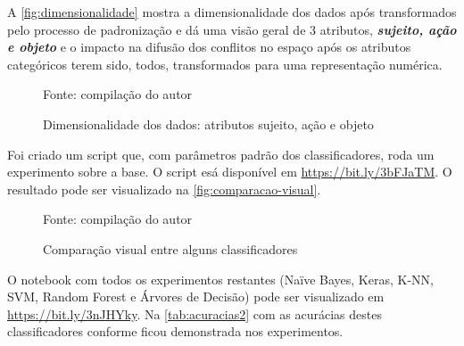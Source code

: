 A \autoref{fig:dimensionalidade} mostra a dimensionalidade dos dados após transformados pelo processo de padronização e dá uma visão geral de 3 atributos, \textit{\textbf{sujeito, ação e objeto}} e o impacto na difusão dos conflitos no espaço após os atributos categóricos terem sido, todos, transformados para uma representação numérica.

\begin{figure}[h]
	\centering
	\caption{Dimensionalidade dos dados: atributos sujeito, ação e objeto}
	
	\label{fig:dimensionalidade}
	{\scriptsize Fonte: compilação do autor}
\end{figure}


Foi criado um script que, com parâmetros padrão dos classificadores, roda um experimento sobre a base. O script esá disponível em \hyperlink{https://bit.ly/3bFJaTM}{https://bit.ly/3bFJaTM}. O resultado pode ser visualizado na \autoref{fig:comparacao-visual}.

\begin{figure}[h]
	\centering
	\caption{Comparação visual entre alguns classificadores}
	
	\label{fig:comparacao-visual}
	{\scriptsize Fonte: compilação do autor}
\end{figure}

O notebook com todos os experimentos restantes (Naïve Bayes, Keras, K-NN, SVM, Random Forest e Árvores de Decisão) pode ser visualizado em \hyperlink{https://bit.ly/3nJHYky}{https://bit.ly/3nJHYky}. Na \autoref{tab:acuracias2} com as acurácias destes classificadores conforme ficou demonstrada nos experimentos.

